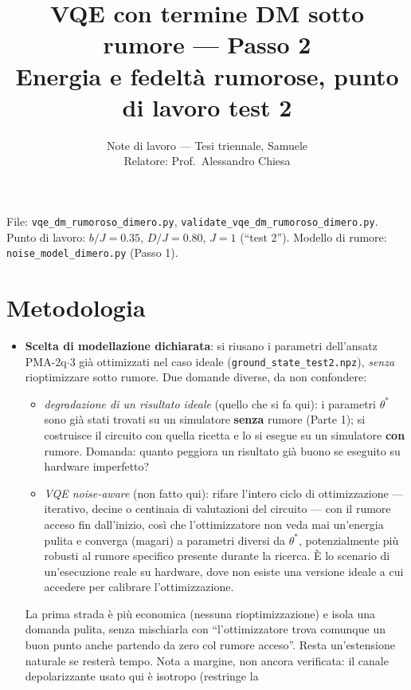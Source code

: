 \documentclass[11pt,a4paper]{article}
\title{\vspace{-1.5em}\color{inkblue}VQE con termine DM sotto rumore --- Passo 2\\[0.2em]
\Large\normalfont\color{softgray}Energia e fedeltà rumorose, punto di lavoro test 2}
\author{Note di lavoro --- Tesi triennale, Samuele\\ Relatore: Prof.\ Alessandro Chiesa}
\date{}
\begin{document}
\sloppy
\maketitle
\thispagestyle{fancy}
\vspace{-2.2em}

File: \texttt{vqe\_dm\_rumoroso\_dimero.py}, \texttt{validate\_vqe\_dm\_rumoroso\_dimero.py}.
Punto di lavoro: $b/J=0.35$, $D/J=0.80$, $J=1$ (``test 2''). Modello di
rumore: \texttt{noise\_model\_dimero.py} (Passo 1).

\section*{Metodologia}

\begin{itemize}[leftmargin=1.3em,itemsep=0.3em]
\item \textbf{Scelta di modellazione dichiarata}: si riusano i parametri
dell'ansatz PMA-2q$\cdot$3 già ottimizzati nel caso ideale
(\texttt{ground\_state\_test2.npz}), \emph{senza} rioptimizzare sotto
rumore. Due domande diverse, da non confondere:
\begin{itemize}[leftmargin=1.3em,itemsep=0.15em]
\item \emph{degradazione di un risultato ideale} (quello che si fa qui):
i parametri $\theta^*$ sono già stati trovati su un simulatore
\textbf{senza} rumore (Parte 1); si costruisce il circuito con quella
ricetta e lo si esegue su un simulatore \textbf{con} rumore. Domanda:
quanto peggiora un risultato già buono se eseguito su hardware
imperfetto?
\item \emph{VQE noise-aware} (non fatto qui): rifare l'intero ciclo di
ottimizzazione --- iterativo, decine o centinaia di valutazioni del
circuito --- con il rumore acceso fin dall'inizio, così che
l'ottimizzatore non veda mai un'energia pulita e converga (magari) a
parametri diversi da $\theta^*$, potenzialmente più robusti al rumore
specifico presente durante la ricerca. È lo scenario di un'esecuzione
reale su hardware, dove non esiste una versione ideale a cui accedere
per calibrare l'ottimizzazione.
\end{itemize}
La prima strada è più economica (nessuna rioptimizzazione) e isola una
domanda pulita, senza mischiarla con ``l'ottimizzatore trova comunque un
buon punto anche partendo da zero col rumore acceso''. Resta
un'estensione naturale se resterà tempo. Nota a margine, non ancora
verificata: il canale depolarizzante usato qui è isotropo (restringe la

\end{itemize}
\end{document}
